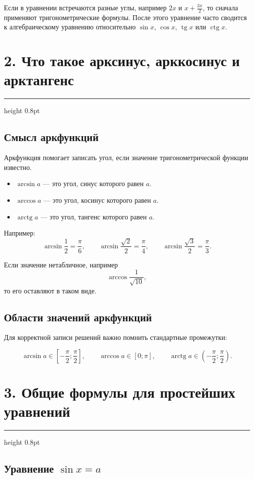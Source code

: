 \documentclass[a4paper,12pt]{article}
\newcommand{\sectionline}{\vspace{0.2em}\textcolor{accent}{\hrule height 0.8pt}\vspace{0.7em}}
\newcommand{\tg}{\mathop{\mathrm{tg}}\nolimits}
\newcommand{\ctg}{\mathop{\mathrm{ctg}}\nolimits}
\newcommand{\arctg}{\mathop{\mathrm{arctg}}\nolimits}
\begin{document}
Если в уравнении встречаются разные углы, например \(2x\) и \(x+\frac{3\pi}{2}\), то сначала применяют тригонометрические формулы. После этого уравнение часто сводится к алгебраическому уравнению относительно \(\sin x\), \(\cos x\), \(\tg x\) или \(\ctg x\).

\section*{2. Что такое арксинус, арккосинус и арктангенс}
\sectionline

\subsection*{Смысл аркфункций}

Аркфункция помогает записать угол, если значение тригонометрической функции известно.

\begin{itemize}
    \item \(\arcsin a\) --- это угол, синус которого равен \(a\).
    \item \(\arccos a\) --- это угол, косинус которого равен \(a\).
    \item \(\arctg a\) --- это угол, тангенс которого равен \(a\).
\end{itemize}

Например:
\[
\arcsin \frac12=\frac{\pi}{6},
\qquad
\arcsin \frac{\sqrt2}{2}=\frac{\pi}{4},
\qquad
\arcsin \frac{\sqrt3}{2}=\frac{\pi}{3}.
\]

Если значение нетабличное, например
\[
\arccos \frac{1}{\sqrt{10}},
\]
то его оставляют в таком виде.

\subsection*{Области значений аркфункций}

Для корректной записи решений важно помнить стандартные промежутки:

\[
\arcsin a\in\left[-\frac{\pi}{2};\frac{\pi}{2}\right],
\qquad
\arccos a\in[0;\pi],
\qquad
\arctg a\in\left(-\frac{\pi}{2};\frac{\pi}{2}\right).
\]

\section*{3. Общие формулы для простейших уравнений}
\sectionline

\subsection*{Уравнение \(\sin x=a\)}
\end{document}

